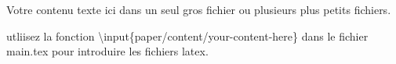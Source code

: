 Votre contenu texte ici dans un seul gros fichier ou plusieurs plus petits fichiers.


utliisez la fonction \textbackslash input\{paper/content/your-content-here\} dans le fichier main.tex pour introduire les fichiers latex. 